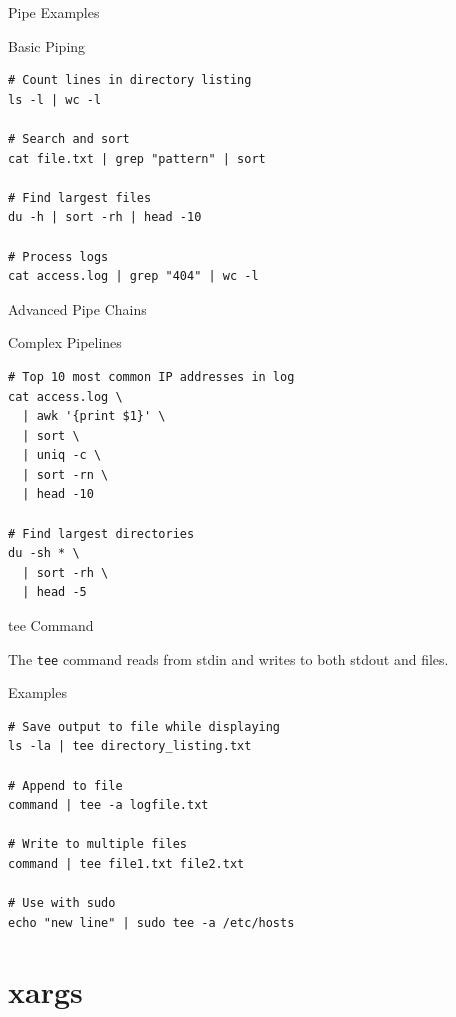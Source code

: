 \documentclass[presentation,aspectratio=1610]{beamer}
\begin{document}
\begin{frame}[label={sec:orgb505aa9},fragile]{Pipe Examples}
 \begin{block}{Basic Piping}
\begin{verbatim}
# Count lines in directory listing
ls -l | wc -l

# Search and sort
cat file.txt | grep "pattern" | sort

# Find largest files
du -h | sort -rh | head -10

# Process logs
cat access.log | grep "404" | wc -l
\end{verbatim}
\end{block}
\end{frame}
\begin{frame}[label={sec:org2c90b71},fragile]{Advanced Pipe Chains}
 \begin{block}{Complex Pipelines}
\begin{verbatim}
# Top 10 most common IP addresses in log
cat access.log \
  | awk '{print $1}' \
  | sort \
  | uniq -c \
  | sort -rn \
  | head -10

# Find largest directories
du -sh * \
  | sort -rh \
  | head -5
\end{verbatim}
\end{block}
\end{frame}
\begin{frame}[label={sec:orgb4966c6},fragile]{tee Command}
 \begin{definition}\label{sec:org0f0aa0f}
The \texttt{tee} command reads from stdin and writes to both stdout and files.
\end{definition}
\begin{block}{Examples}
\begin{verbatim}
# Save output to file while displaying
ls -la | tee directory_listing.txt

# Append to file
command | tee -a logfile.txt

# Write to multiple files
command | tee file1.txt file2.txt

# Use with sudo
echo "new line" | sudo tee -a /etc/hosts
\end{verbatim}
\end{block}
\end{frame}
\section*{xargs}
\label{sec:org2229d70}
\end{document}
